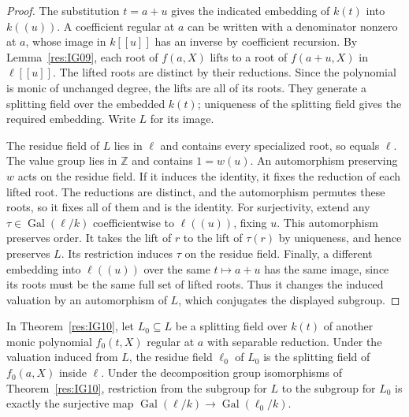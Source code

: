 \begin{proof}
The substitution \(t=a+u\) gives the indicated embedding of
\(k(t)\) into \(k((u))\). A coefficient regular at \(a\) can be
written with a denominator nonzero at \(a\), whose image in
\(k[[u]]\) has an inverse by coefficient recursion.
By Lemma~\ref{res:IG09}, each root of \(f(a,X)\) lifts to a root
of \(f(a+u,X)\) in \(\ell[[u]]\). The lifted roots are distinct
by their reductions. Since the polynomial is monic of unchanged
degree, the lifts are all of its roots. They generate a splitting
field over the embedded \(k(t)\); uniqueness of the splitting field
gives the required embedding. Write \(L\) for its image.

The residue field of \(L\) lies in \(\ell\) and contains every
specialized root, so equals \(\ell\). The value group lies in
\(\mathbb Z\) and contains \(1=w(u)\). An automorphism preserving
\(w\) acts on the residue field. If it induces the identity, it
fixes the reduction of each lifted root. The reductions are distinct,
and the automorphism permutes these roots, so it fixes all of them
and is the identity. For surjectivity, extend any
\(\tau\in\operatorname{Gal}(\ell/k)\) coefficientwise to
\(\ell((u))\), fixing \(u\). This automorphism preserves order.
It takes the lift of \(r\) to the lift of \(\tau(r)\) by uniqueness,
and hence preserves \(L\). Its restriction induces \(\tau\) on
the residue field. Finally, a different embedding into
\(\ell((u))\) over the same \(t\mapsto a+u\) has the same image,
since its roots must be the same full set of lifted roots.
Thus it changes the induced valuation by an automorphism of \(L\),
which conjugates the displayed subgroup.
\end{proof}

\begin{corollary}
\label{res:IG11}
In Theorem~\ref{res:IG10}, let \(L_0\subseteq L\) be a splitting
field over \(k(t)\) of another monic polynomial \(f_0(t,X)\)
regular at \(a\) with separable reduction. Under the valuation
induced from \(L\), the residue field \(\ell_0\) of \(L_0\) is
the splitting field of \(f_0(a,X)\) inside \(\ell\).
Under the decomposition group isomorphisms of
Theorem~\ref{res:IG10}, restriction from the subgroup for \(L\)
to the subgroup for \(L_0\) is exactly the surjective map
\(\operatorname{Gal}(\ell/k)\to\operatorname{Gal}(\ell_0/k)\).
\end{corollary}

